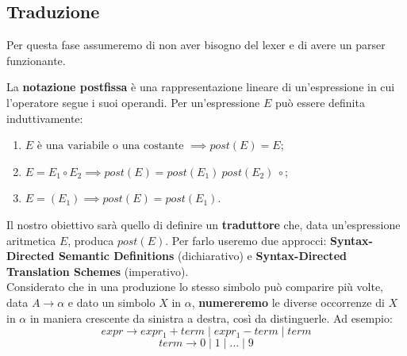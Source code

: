 \documentclass[12pt]{article}
\begin{document}
\subsection{Traduzione}
Per questa fase assumeremo di non aver bisogno del lexer e di avere un parser funzionante.
\begin{definition}
La \textbf{notazione postfissa} è una rappresentazione lineare di un'espressione in cui l'operatore segue i suoi operandi. Per un'espressione $E$ può essere definita induttivamente:
\begin{enumerate}
    \item $E \text{ è una variabile o una costante } \implies post(E) = E$;
    \item $E = E_1 \circ E_2 \implies post(E) = post(E_1) \ post(E_2) \ \circ$;
    \item $E = (E_1) \implies post(E) = post(E_1)$.
\end{enumerate}
\end{definition}
\noindent Il nostro obiettivo sarà quello di definire un \textbf{traduttore} che, data un'espressione aritmetica $E$, produca $post(E)$.
Per farlo useremo due approcci: \textbf{Syntax-Directed Semantic Definitions} (dichiarativo) e \textbf{Syntax-Directed Translation Schemes} (imperativo).\\
Considerato che in una produzione lo stesso simbolo può comparire più volte, data $A \to \alpha$ e dato un simbolo $X$ in $\alpha$, \textbf{numereremo} le diverse occorrenze di $X$ in $\alpha$ in maniera crescente da sinistra a destra, così da distinguerle. Ad esempio:
$$expr \to expr_1 + term \mid expr_1 - term \mid term$$
$$term \to 0 \mid 1 \mid \dots \mid 9$$
\end{document}
